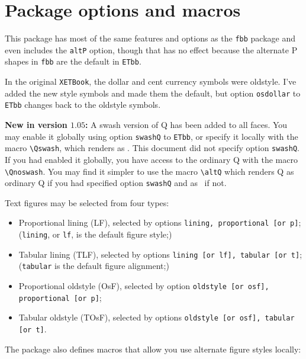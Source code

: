 \documentclass[11pt]{article}
\begin{document}
\section*{Package options and macros}


This package has most of the same features and options as the {\tt fbb} package and even includes the {\tt altP} option, though that has no effect because the  alternate P shapes in {\tt fbb} are the default in {\tt ETbb}. 

In the original {\tt XETBook}, the dollar and cent currency symbols were oldstyle. I've added the new style symbols and made them the default, but option {\tt osdollar} to {\tt ETbb} changes back to the oldstyle symbols.


\textbf{New in version $1.05$:} A swash version of Q has been added to all faces. You may enable it globally using option {\tt swashQ} to {\tt ETbb}, or specify it locally with the macro \verb|\Qswash|, which renders as \Qswash. This document did not specify option {\tt swashQ}. If you had enabled it globally, you have access to the ordinary Q with the macro \verb|\Qnoswash|. You may find it simpler to use the macro \verb|\altQ| which renders Q as ordinary Q if you had specified option {\tt swashQ} and as \altQ\ if not.

Text figures may be selected from four types:
\begin{itemize}
\item
Proportional lining (LF), selected by options {\tt lining, proportional [or p]}; ({\tt lining}, or {\tt lf}, is the default figure style;)
\item
Tabular lining (TLF), selected by options {\tt lining [or lf], tabular [or t]}; ({\tt tabular} is the default figure alignment;)
\item
Proportional oldstyle (OsF), selected by option {\tt oldstyle [or osf], proportional [or p]};
\item
Tabular oldstyle (TOsF), selected by options {\tt oldstyle [or osf], tabular [or t]}.
\end{itemize}
The package also defines macros that allow you use alternate figure styles locally:
\end{document}
